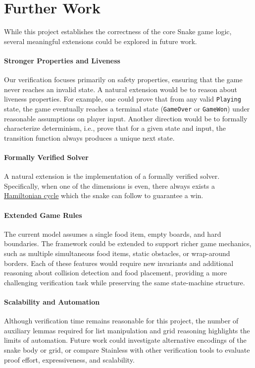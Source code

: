 \documentclass[letterpaper, 11pt]{article}
\begin{document}
\section{Further Work}
While this project establishes the correctness of the core Snake game logic, several meaningful
extensions could be explored in future work.

\paragraph{Stronger Properties and Liveness}
Our verification focuses primarily on safety properties, ensuring that the game never reaches an
invalid state. A natural extension would be to reason about liveness properties. For example,
one could prove that from any valid \texttt{Playing} state, the game eventually reaches a
terminal state (\texttt{GameOver} or \texttt{GameWon}) under reasonable
assumptions on player input. Another direction would be to formally characterize determinism, i.e.,
prove that for a given state and input, the transition function always produces a unique next state.

\paragraph{Formally Verified Solver} A natural extension is the implementation of a formally
verified solver. Specifically, when one of the dimensions is even, there always exists a 
\href{http://www.datagenetics.com/blog/april42013/}{Hamiltonian cycle} which the snake can follow to
guarantee a win.

\paragraph{Extended Game Rules}
The current model assumes a single food item, empty boards, and hard boundaries. The framework could
be extended to support richer game mechanics, such as multiple simultaneous food items, static
obstacles, or wrap-around borders. Each of these features would require new invariants and
additional reasoning about collision detection and food placement, providing a more challenging
verification task while preserving the same state-machine structure.

\paragraph{Scalability and Automation}
Although verification time remains reasonable for this project, the number of auxiliary lemmas
required for list manipulation and grid reasoning highlights the limits of automation. Future work
could investigate alternative encodings of the snake body or grid, or compare Stainless with other
verification tools to evaluate proof effort, expressiveness, and scalability.
\end{document}
